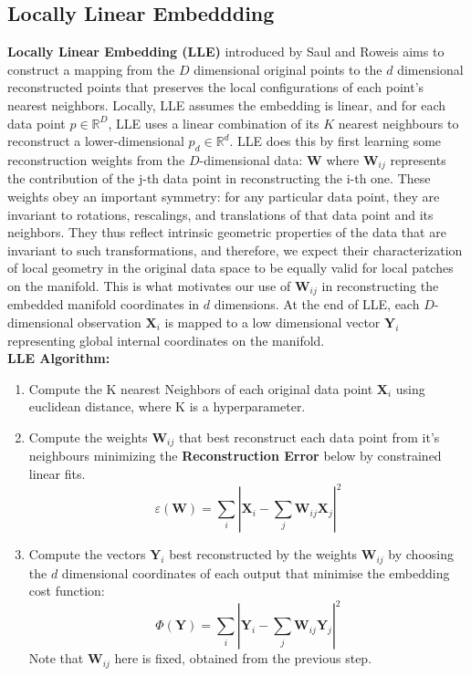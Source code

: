 \documentclass[12pt]{report}
\begin{document}
\newpage

\subsection{Locally Linear Embeddding}

\textbf{Locally Linear Embedding (LLE)} introduced by 
Saul and Roweis \cite{lle} aims to construct 
a mapping from the $D$ dimensional 
original points to the $d$ dimensional reconstructed points
that preserves the local configurations of each point's nearest neighbors. 
Locally, LLE assumes the embedding is linear, 
and for each data point $p \in \mathbb{R}^D$, 
LLE uses a linear combination of its $K$ nearest neighbours 
to reconstruct a lower-dimensional $p_d \in \mathbb{R}^d$. 
LLE does this by first learning some 
reconstruction weights from the $D$-dimensional data: $\mathbf{W}$ 
where $\mathbf{W}_{ij}$ represents the contribution 
of the j-th data point in reconstructing the i-th one. 
These weights obey an important symmetry: for any particular data point, 
they are invariant to rotations, rescalings, and translations 
of that data point and its neighbors.
They thus reflect intrinsic geometric properties 
of the data that are invariant to such transformations,
and therefore, we expect their characterization of local geometry in the 
original data space to be equally valid for local patches on the manifold.
This is what motivates our use of $\mathbf{W}_{ij}$ in reconstructing
the embedded manifold coordinates in $d$ dimensions. 
At the end of LLE, each $D$-dimensional observation $\mathbf{X}_i$ 
is mapped to a low dimensional vector $\mathbf{Y}_i$ 
representing global internal coordinates on the manifold.\\
\textbf{LLE Algorithm:}
\begin{enumerate}
    \item Compute the K nearest Neighbors of each original data point 
    $\mathbf{X}_i$ using euclidean distance, where K is a hyperparameter.
    \item Compute the weights $\mathbf{W}_{ij}$ that best 
    reconstruct each data point from it's neighbours 
    minimizing the \textbf{Reconstruction Error} below by constrained linear fits.
$$\varepsilon (\mathbf{W}) = \sum_i|\mathbf{X}_i - \sum_j \mathbf{W}_{ij} \mathbf{X}_j|^2$$
    \item Compute the vectors $\mathbf{Y}_i$ best 
    reconstructed by the weights $\mathbf{W}_{ij}$ 
    by choosing the $d$ dimensional coordinates of each output  
    that minimise the embedding cost function: 
    $$\Phi(\mathbf{Y}) = \sum_i |\mathbf{Y}_i - \sum_j \mathbf{W}_{ij}\mathbf{Y}_j|^2$$
    Note that $\mathbf{W}_{ij}$ here is fixed, obtained from the previous step.
\end{enumerate}
\end{document}
